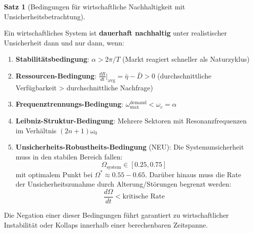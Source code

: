 \documentclass[a4paper,12pt,twoside]{report}
\theoremstyle{definition}
\newtheorem{satz}{Satz}
\begin{document}
\begin{satz}[Bedingungen für wirtschaftliche Nachhaltigkeit mit Unsicherheitsbetrachtung]
\label{satz:nachhaltigkeit_erweitert}

Ein wirtschaftliches System ist \textbf{dauerhaft nachhaltig} unter realistischer Unsicherheit dann und nur dann, wenn:

\begin{enumerate}
    \item \textbf{Stabilitätsbedingung}: $\alpha > 2\pi/T$ (Markt reagiert schneller als Naturzyklus)
    
    \item \textbf{Ressourcen-Bedingung}: $\frac{dR}{dt}\bigg|_{\text{avg}} = \bar{\eta} - \bar{D} > 0$ (durchschnittliche Verfügbarkeit > durchschnittliche Nachfrage)
    
    \item \textbf{Frequenztrennungs-Bedingung}: $\omega_{\max}^{\text{demand}} < \omega_c = \alpha$
    
    \item \textbf{Leibniz-Struktur-Bedingung}: Mehrere Sektoren mit Resonanzfrequenzen im Verhältnis $(2n+1)\omega_0$
    
    \item \textbf{Unsicherheits-Robustheits-Bedingung} (NEU): Die Systemunsicherheit muss in den stabilen Bereich fallen:
    \begin{equation}
    \Omega_{\text{system}} \in [0.25, 0.75]
    \end{equation}
    mit optimalem Punkt bei $\Omega^* \approx 0.55-0.65$. Darüber hinaus muss die Rate der Unsicherheitszunahme durch Alterung/Störungen begrenzt werden:
    \begin{equation}
    \frac{d\Omega}{dt} < \text{kritische Rate}
    \end{equation}
\end{enumerate}

Die Negation einer dieser Bedingungen führt garantiert zu wirtschaftlicher Instabilität oder Kollaps innerhalb einer berechenbaren Zeitspanne.

\end{satz}
\end{document}
